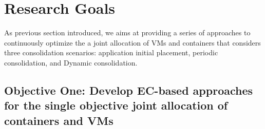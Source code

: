 \section{Research Goals}
As previous section introduced, we aims at providing a series of approaches to continuously optimize the a joint allocation of VMs and containers that considers three consolidation scenarios: application initial placement, periodic consolidation, and Dynamic consolidation. 

\subsection{Objective One: Develop EC-based approaches for the single objective joint allocation of containers and VMs}
\label{sec:obj1}




